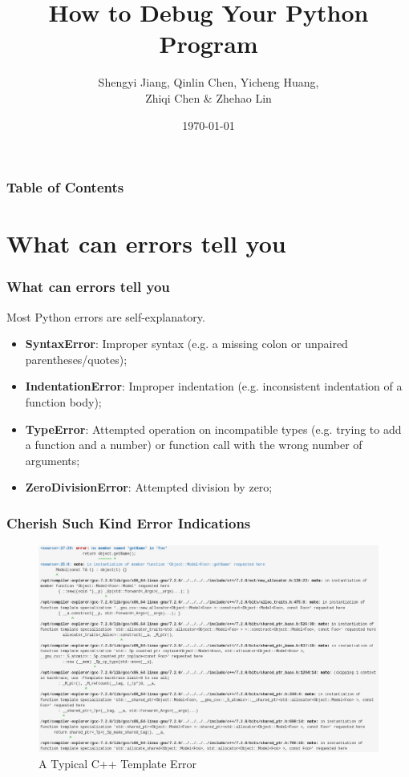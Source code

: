 \documentclass[aspectratio=169]{beamer}
\title{How to Debug Your Python Program}
\author{Shengyi Jiang, Qinlin Chen, Yicheng Huang, \\ Zhiqi Chen \& Zhehao Lin}
\date{\today}
\begin{document}
\frame{\titlepage}


\begin{frame}
\frametitle{Table of Contents}
\tableofcontents[hidesubsections]
\end{frame}

\section{What can errors tell you}

\begin{frame}
\frametitle{What can errors tell you}
Most Python errors are self-explanatory. 

\begin{itemize}
\item \textbf{SyntaxError}:	Improper syntax (e.g. a missing colon or unpaired parentheses/quotes);
\item \textbf{IndentationError}: Improper indentation (e.g. inconsistent indentation of a function body);
\item \textbf{TypeError}: Attempted operation on incompatible types (e.g. trying to add a function and a number) or function call with the wrong number of arguments;
\item \textbf{ZeroDivisionError}: Attempted division by zero;
\end{itemize}

\end{frame}

\begin{frame}
\frametitle{Cherish Such Kind Error Indications}
\begin{figure}
\includegraphics[width=0.6\linewidth]{./imgs/errorClang.png}
\caption{A Typical C++ Template Error}
\end{figure}
\end{frame}
\end{document}
